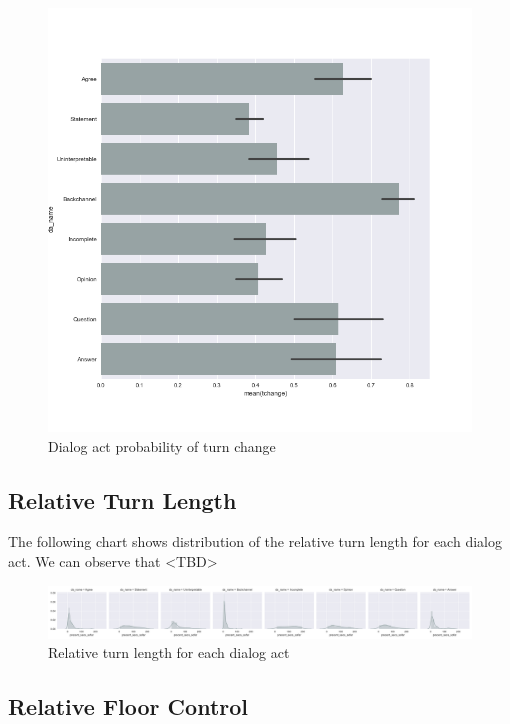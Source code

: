 \begin{figure}
\centering
\includegraphics[width=\textwidth]{../scikitlearn/figures/barplot_da_prob_to_tchange.png}
\caption{Dialog act probability of turn change\label{overflow}}
\end{figure}


\subsection{Relative Turn Length}

The following chart shows distribution of the relative turn length for each dialog act. We can observe
that <TBD>

\begin{figure}
\centering
\includegraphics[width=\textwidth]{../scikitlearn/figures/grid_precent_secs_sofar_by_da_name.pdf}
\caption{Relative turn length for each dialog act\label{overflow}}
\end{figure}
 

\subsection{Relative Floor Control}


